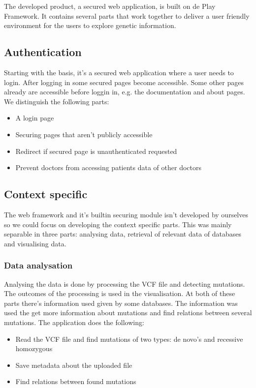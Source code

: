 The developed product, a secured web application, is built on de Play Framework. It contains several parts that work together to deliver a user friendly environment for the users to explore genetic information.

\subsection{Authentication}

Starting with the basis, it's a secured web application where a user needs to login. After logging in some secured pages become accessible. Some other pages already are accessible before loggin in, e.g. the documentation and about pages. We distinguish the following parts:

\begin{itemize}
  \item A login page
  \item Securing pages that aren't publicly accessible
  \item Redirect if secured page is unauthenticated requested
  \item Prevent doctors from accessing patients data of other doctors
\end{itemize}

\subsection{Context specific}

The web framework and it's builtin securing module isn't developed by ourselves so we could focus on developing the context specific parts. This was mainly separable in three parts: analysing data, retrieval of relevant data of databases and visualising data.

\subsubsection{Data analysation}

Analysing the data is done by processing the VCF file and detecting mutations. The outcomes of the processing is used in the visualisation. At both of these parts there's information used given by some databases. The information was used the get more information about mutations and find relations between several mutations. The application does the following:

\begin{itemize}
  \item Read the VCF file and find mutations of two types: de novo's and recessive homozygous
  \item Save metadata about the uploaded file
  \item Find relations between found mutations
\end{itemize}

